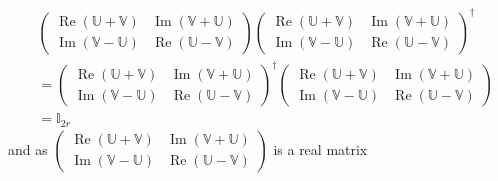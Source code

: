 \documentclass[aps, preprint]{revtex4}
\begin{document}
\begin{align} & \left (\begin{array}{cc}\ensuremath{\operatorname*{Re}} \left (\mathbb{U} +\mathbb{V}\right ) & \ensuremath{\operatorname*{Im}} \left (\mathbb{V} +\mathbb{U}\right ) \\
\ensuremath{\operatorname*{Im}} \left (\mathbb{V} -\mathbb{U}\right ) & \ensuremath{\operatorname*{Re}} \left (\mathbb{U} -\mathbb{V}\right )\end{array}\right ) \left (\begin{array}{cc}\ensuremath{\operatorname*{Re}} \left (\mathbb{U} +\mathbb{V}\right ) & \ensuremath{\operatorname*{Im}} \left (\mathbb{V} +\mathbb{U}\right ) \\
\ensuremath{\operatorname*{Im}} \left (\mathbb{V} -\mathbb{U}\right ) & \ensuremath{\operatorname*{Re}} \left (\mathbb{U} -\mathbb{V}\right )\end{array}\right )^{ \dag } \nonumber  \\
 &  =\left (\begin{array}{cc}\ensuremath{\operatorname*{Re}} \left (\mathbb{U} +\mathbb{V}\right ) & \ensuremath{\operatorname*{Im}} \left (\mathbb{V} +\mathbb{U}\right ) \\
\ensuremath{\operatorname*{Im}} \left (\mathbb{V} -\mathbb{U}\right ) & \ensuremath{\operatorname*{Re}} \left (\mathbb{U} -\mathbb{V}\right )\end{array}\right )^{ \dag } \left (\begin{array}{cc}\ensuremath{\operatorname*{Re}} \left (\mathbb{U} +\mathbb{V}\right ) & \ensuremath{\operatorname*{Im}} \left (\mathbb{V} +\mathbb{U}\right ) \\
\ensuremath{\operatorname*{Im}} \left (\mathbb{V} -\mathbb{U}\right ) & \ensuremath{\operatorname*{Re}} \left (\mathbb{U} -\mathbb{V}\right )\end{array}\right ) \nonumber  \\
 &  =\mathbb{I}_{2 r}\end{align}and as $\left (\begin{array}{cc}\ensuremath{\operatorname*{Re}} \left (\mathbb{U} +\mathbb{V}\right ) & \ensuremath{\operatorname*{Im}} \left (\mathbb{V} +\mathbb{U}\right ) \\
\ensuremath{\operatorname*{Im}} \left (\mathbb{V} -\mathbb{U}\right ) & \ensuremath{\operatorname*{Re}} \left (\mathbb{U} -\mathbb{V}\right )\end{array}\right )$ is a real matrix
\end{document}
